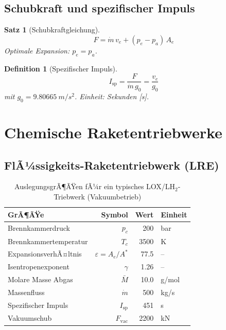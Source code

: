 ﻿\documentclass[12pt,a4paper]{article}
\newtheorem{satz}{Satz}[section]
\newtheorem{definition}{Definition}[section]
\newcommand{\Isp}{I_{\mathrm{sp}}}
\newcommand{\ve}{v_e}
\newcommand{\mdot}{\dot{m}}
\begin{document}
\subsection{Schubkraft und spezifischer Impuls}

\begin{satz}[Schubkraftgleichung]
\[
  \boxed{F = \mdot\,\ve + (p_e - p_a)\,A_e}
\]
Optimale Expansion: $p_e = p_a$.
\end{satz}

\begin{definition}[Spezifischer Impuls]
\[
  \boxed{\Isp = \frac{F}{\mdot\,g_0} = \frac{\ve}{g_0}}
\]
mit $g_0 = \SI{9.80665}{m/s^2}$. Einheit: Sekunden [s].
\end{definition}

\section{Chemische Raketentriebwerke}

\subsection{FlÃ¼ssigkeits-Raketentriebwerk (LRE)}

\begin{table}[H]
\centering
\caption{AuslegungsgrÃ¶ÃŸen fÃ¼r ein typisches LOX/LH$_2$-Triebwerk (Vakuum\-betrieb)}
\label{tab:triebwerk}
\begin{tabular}{lrrl}
\toprule
\textbf{GrÃ¶ÃŸe} & \textbf{Symbol} & \textbf{Wert} & \textbf{Einheit}\\
\midrule
Brennkammerdruck        & $p_c$     & 200        & bar\\
Brennkammertemperatur   & $T_c$     & 3500       & K\\
ExpansionsverhÃ¤ltnis    & $\varepsilon = A_e/A^*$ & 77.5 & --\\
Isentropenexponent      & $\gamma$  & 1.26       & --\\
Molare Masse Abgas      & $\bar{M}$ & 10.0       & g/mol\\
Massenfluss             & $\mdot$   & 500        & kg/s\\
Spezifischer Impuls     & $\Isp$    & 451        & s\\
Vakuumschub             & $F_{\mathrm{vac}}$ & 2200 & kN\\
\bottomrule
\end{tabular}
\end{table}
\end{document}
